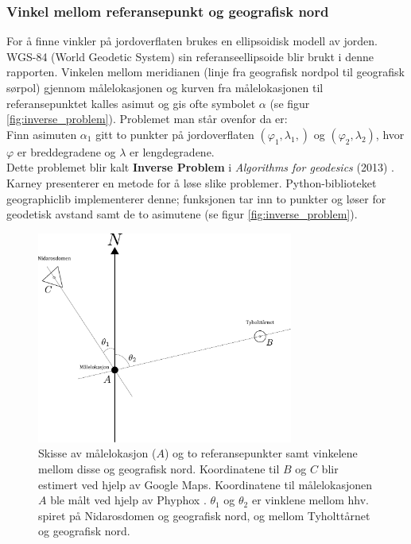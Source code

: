 \subsubsection{Vinkel mellom referansepunkt og geografisk nord}

For å finne vinkler på jordoverflaten brukes en ellipsoidisk modell av jorden.
WGS-84 (World Geodetic System) sin referanseellipsoide blir brukt i denne rapporten.
Vinkelen mellom meridianen (linje fra geografisk nordpol til geografisk sørpol) gjennom målelokasjonen og 
kurven fra målelokasjonen til referansepunktet kalles asimut \cite{asimut} og gis ofte symbolet $\alpha$ (se figur \ref{fig:inverse_problem}).
Problemet man står ovenfor da er:
\\

Finn asimuten $\alpha_1$ gitt to punkter på jordoverflaten $(\varphi_1, \lambda_1, )$ og $(\varphi_2, \lambda_2)$, hvor $\varphi$ er breddegradene og $\lambda$ er lengdegradene. 
\\

Dette problemet blir kalt \textbf{Inverse Problem} i \textit{Algorithms for geodesics} (2013) \cite{Karney}. Karney presenterer en metode for å løse slike problemer. Python-biblioteket geographiclib implementerer denne; funksjonen  tar inn to punkter og løser for geodetisk avstand samt de to asimutene \cite{geographiclib} (se figur \ref{fig:inverse_problem}).

\begin{figure}
    \centering
    \includegraphics[width=0.75\textwidth]{img/angle_north.pdf}
    \caption{
    Skisse av målelokasjon ($A$) og to referansepunkter samt vinkelene mellom disse og geografisk nord.
    Koordinatene til $B$ og $C$ blir estimert ved hjelp av Google Maps. 
    Koordinatene til målelokasjonen $A$ ble målt ved hjelp av Phyphox \cite{phyphox}.
    $\theta_1$ og $\theta_2$ er vinklene mellom hhv. spiret på Nidarosdomen og geografisk nord, og mellom Tyholttårnet og geografisk nord.}
    \label{fig:angle_north}
\end{figure}

